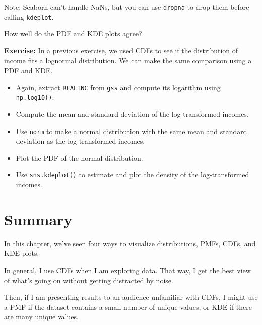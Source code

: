 Note: Seaborn can't handle NaNs, but you can use
\passthrough{\lstinline!dropna!} to drop them before calling
\passthrough{\lstinline!kdeplot!}.

How well do the PDF and KDE plots agree?

\textbf{Exercise:} In a previous exercise, we used CDFs to see if the
distribution of income fits a lognormal distribution. We can make the
same comparison using a PDF and KDE.

\begin{itemize}
\item
  Again, extract \passthrough{\lstinline!REALINC!} from
  \passthrough{\lstinline!gss!} and compute its logarithm using
  \passthrough{\lstinline!np.log10()!}.
\item
  Compute the mean and standard deviation of the log-transformed
  incomes.
\item
  Use \passthrough{\lstinline!norm!} to make a normal distribution with
  the same mean and standard deviation as the log-transformed incomes.
\item
  Plot the PDF of the normal distribution.
\item
  Use \passthrough{\lstinline!sns.kdeplot()!} to estimate and plot the
  density of the log-transformed incomes.
\end{itemize}

\hypertarget{summary}{%
\section{Summary}\label{summary}}

In this chapter, we've seen four ways to visualize distributions, PMFs,
CDFs, and KDE plots.

In general, I use CDFs when I am exploring data. That way, I get the
best view of what's going on without getting distracted by noise.

Then, if I am presenting results to an audience unfamiliar with CDFs, I
might use a PMF if the dataset contains a small number of unique values,
or KDE if there are many unique values.

